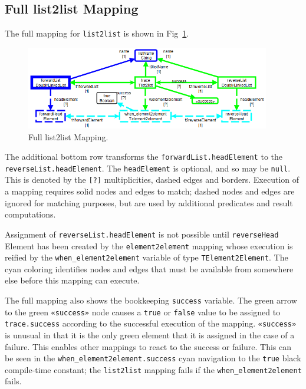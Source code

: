 \documentclass{llncs}
\begin{document}
\subsection{Full list2list Mapping}

The full mapping for \verb$list2list$ is shown in Fig~\ref{fig:list2list Mapping}.

\begin{figure}[h]
	\centering
	\includegraphics[width=0.95\textwidth]{list2list.png}
	\caption{Full list2list Mapping.}
	\label{fig:list2list Mapping}
\end{figure}

The additional bottom row transforms the \verb$forwardList.headElement$ to the \verb$reverseList.headElement$. The \verb$headElement$ is optional, and so may be \verb$null$. This is denoted by the \verb$[?]$ multiplicities, dashed edges and borders. Execution of a mapping requires solid nodes and edges to match; dashed nodes and edges are ignored for matching purposes, but are used by additional predicates and result computations.

Assignment of \verb$reverseList.headElement$ is not possible until \verb$reverseHead$ Element has been created by the \verb$element2element$ mapping whose execution is reified by the \verb$when_element2element$ variable of type \verb$TElement2Element$. The cyan coloring identifies nodes and edges that must be available from somewhere else before this mapping can execute.

The full mapping also shows the bookkeeping \verb$success$ variable. The green arrow to the green \verb$«success»$ node causes a \verb$true$ or \verb$false$ value to be assigned to \verb$trace.success$ according to the successful execution of the mapping. \verb$«success»$ is unusual in that it is the only green element that it is assigned in the case of a failure. This enables other mappings to react to the success or failure. This can be seen in the \verb$when_element2element.success$ cyan navigation to the \verb$true$ black compile-time constant; the \verb$list2list$ mapping fails if the \verb$when_element2element$ fails.
\end{document}

